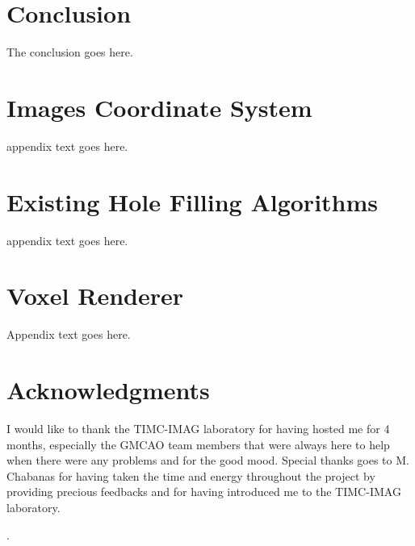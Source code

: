 \documentclass[12pt,journal,compsoc]{IEEEtran}
\begin{document}
\section{Conclusion}
The conclusion goes here.

\appendices
\section{Images Coordinate System}
appendix text goes here.

\section{Existing Hole Filling Algorithms}
appendix text goes here.

\section{Voxel Renderer}
Appendix text goes here.

\section*{Acknowledgments}
I would like to thank the TIMC-IMAG laboratory for having hosted me for 4 months, especially the GMCAO team members that were always here to help when there were any problems and for the good mood. Special thanks goes to M. Chabanas for having taken the time and energy throughout the project by providing precious feedbacks and for having introduced me to the TIMC-IMAG laboratory.

\cite{1}\cite{2}\cite{3}\cite{4}\cite{5}\cite{6}\cite{7}.






\end{document}
